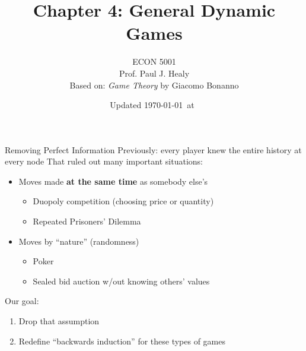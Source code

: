 

\title[Dynamic Games]{Chapter 4: General Dynamic Games}
\author[ECON 5001]{ECON 5001\\Prof. Paul J. Healy\\Based on: \textit{Game Theory} by Giacomo Bonanno} \color{metrop}
\institute[OSU]{}
\date[]{\vfill {\tiny Updated \today\ at\ \DTMcurrenttime}}
    



\frame{\maketitle}

\begin{frame}{Removing Perfect Information}
Previously: every player knew the entire history at every node
\bsk
That ruled out many important situations:
\begin{itemize}
    \item Moves made \textbf{at the same time} as somebody else's
    \begin{itemize}
        \item Duopoly competition (choosing price or quantity)
        \item Repeated Prisoners' Dilemma
    \end{itemize}
    \item Moves by ``nature'' (randomness)
    \begin{itemize}
        \item Poker
        \item Sealed bid auction w/out knowing others' values
    \end{itemize}
\end{itemize}
\vfill
Our goal:
\begin{enumerate}
    \item Drop that assumption
    \item Redefine ``backwards induction'' for these types of games
\end{enumerate}
\vspace{-0.4in}
\end{frame}

